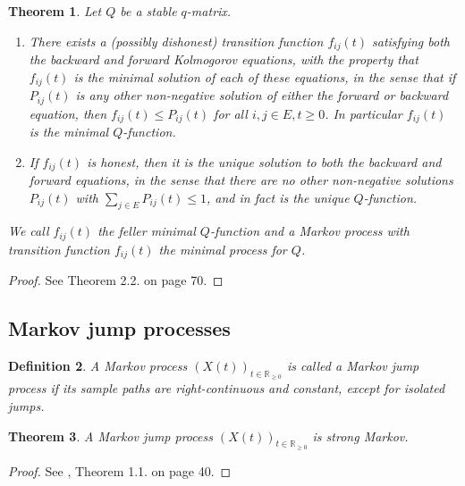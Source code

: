 \documentclass[12pt,a4paper]{scrartcl}
\newtheorem{theorem}{Theorem}[section]
\newtheorem{definition}[theorem]{Definition}
\numberwithin{equation}{section}
\newcommand{\R}{\mathbb{R}} %
\begin{document}
\begin{theorem}
Let $ Q $ be a stable $q$-matrix. 
\begin{enumerate}
\item There exists a (possibly dishonest) transition function $ f_{ij}\left(t\right) $ satisfying both the backward and forward Kolmogorov equations, with the property that $ f_{ij}\left(t\right) $ is the minimal solution of each of these equations, in the sense that if $ P_{ij}\left(t\right) $ is any other non-negative solution of either the forward or backward equation, then $ f_{ij}\left(t\right) \leq P_{ij}\left(t\right) $ for all $ i,j \in E, t\geq 0$. In particular $ f_{ij}\left(t\right) $ is the minimal $Q$-function.
\item If $ f_{ij}\left(t\right) $ is honest, then it is the unique solution to both the backward and forward equations, in the sense that there are no other non-negative solutions $P_{ij}\left(t\right)$ with $\sum_{j \in E} P_{ij}\left(t\right) \leq 1 $, and in fact is the unique $Q$-function.
\end{enumerate}
We call $f_{ij}\left(t\right)$ the feller minimal $Q$-function and a Markov process with transition function $f_{ij}\left(t\right)$ the minimal process for $Q$.
\end{theorem}
\begin{proof}
See \cite{anderson} Theorem 2.2. on page 70.
\end{proof}

\subsection{Markov jump processes}



\begin{definition}
A Markov process $\left(X\left(t\right)\right)_{t \in \R_{\geq 0}}$ is called a Markov jump process if its sample paths are right-continuous and constant, except for isolated jumps.
\end{definition}

\begin{theorem}
A Markov jump process $\left(X\left(t\right)\right)_{t \in \R_{\geq 0}}$ is strong Markov.
\end{theorem}

\begin{proof}
See \cite{asmussen}, Theorem 1.1. on page 40.
\end{proof}
\end{document}

